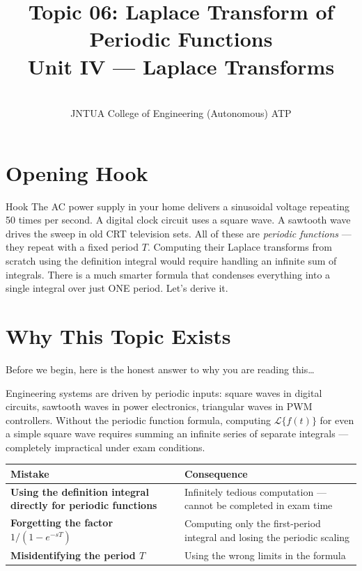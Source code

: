 \documentclass[12pt,a4paper]{article}
\title{Topic 06: Laplace Transform of Periodic Functions \\
       \large Unit IV --- Laplace Transforms}
\author{ \\
        JNTUA College of Engineering (Autonomous) ATP}
\date{}
\begin{document}
\maketitle
\tableofcontents
\newpage

\section{Opening Hook}

\begin{curiositybox}{Hook}
The AC power supply in your home delivers a sinusoidal voltage repeating 50
times per second.  A digital clock circuit uses a square wave.  A sawtooth
wave drives the sweep in old CRT television sets.  All of these are
\emph{periodic functions} --- they repeat with a fixed period $T$.
Computing their Laplace transforms from scratch using the definition integral
would require handling an infinite sum of integrals.  There is a much smarter
formula that condenses everything into a single integral over just ONE period.
Let's derive it.
\end{curiositybox}

\section{Why This Topic Exists}

Before we begin, here is the honest answer to why you are reading this\ldots

Engineering systems are driven by periodic inputs: square waves in digital
circuits, sawtooth waves in power electronics, triangular waves in PWM
controllers.  Without the periodic function formula, computing
$\mathcal{L}\{f(t)\}$ for even a simple square wave requires summing an
infinite series of separate integrals --- completely impractical under exam
conditions.

\begin{center}
\begin{tabular}{>{\bfseries}p{6.5cm} p{8cm}}
\toprule
Mistake & Consequence \\
\midrule
Using the definition integral directly for periodic functions
  & Infinitely tedious computation --- cannot be completed in exam time \\[4pt]
Forgetting the factor $1/(1-e^{-sT})$
  & Computing only the first-period integral and losing the periodic scaling \\[4pt]
Misidentifying the period $T$
  & Using the wrong limits in the formula \\
\bottomrule
\end{tabular}
\end{center}
\end{document}

